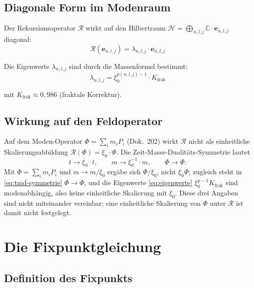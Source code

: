 \subsection{Diagonale Form im Modenraum}

Der Rekursionsoperator $\mathcal{R}$ wirkt auf den Hilbertraum
$\mathcal{H} = \bigoplus_{n,l,j}\mathbb{C}\cdot\mathbf{e}_{n,l,j}$
diagonal:
\begin{equation}
  \mathcal{R}(\mathbf{e}_{n,l,j})
  = \lambda_{n,l,j} \cdot \mathbf{e}_{n,l,j}
  \label{eq:R-diagonal}
\end{equation}

Die Eigenwerte $\lambda_{n,l,j}$ sind durch die Massenformel bestimmt:
\begin{equation}
  \lambda_{n,l,j} = \xi_0^{p(n,l,j)-1} \cdot K_{\text{frak}}
  \label{eq:eigenwerte}
\end{equation}

mit $K_{\text{frak}} \approx 0{,}986$ (fraktale Korrektur).

\subsection{Wirkung auf den Feldoperator}

Auf dem Moden-Operator $\Phi = \sum_i m_i P_i$ (Dok.~202) wirkt
$\mathcal{R}$ nicht als einheitliche Skalierungsabbildung
$\mathcal{R}(\Phi) = \xi_0 \cdot \Phi$. Die Zeit-Masse-Dualitäts-Symmetrie
lautet
\begin{equation}
  t \to \xi_0 \cdot t, \qquad m \to \xi_0^{-1} \cdot m,
  \qquad \Phi \to \Phi .
  \label{eq:tmd-symmetrie}
\end{equation}
Mit $\Phi = \sum_i m_i P_i$ und $m \to m/\xi_0$ ergäbe sich
$\Phi/\xi_0$, nicht $\xi_0\Phi$; zugleich steht in
\eqref{eq:tmd-symmetrie} $\Phi \to \Phi$, und die Eigenwerte
\eqref{eq:eigenwerte} $\xi_0^{p-1}K_{\text{frak}}$ sind modenabhängig,
also keine einheitliche Skalierung mit $\xi_0$. Diese drei Angaben
sind nicht miteinander vereinbar; eine einheitliche Skalierung von
$\Phi$ unter $\mathcal{R}$ ist damit nicht festgelegt.

\section{Die Fixpunktgleichung}

\subsection{Definition des Fixpunkts}

